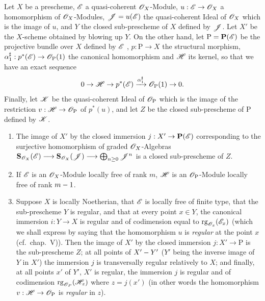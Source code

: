 \begin{proposition}[19.4.11]
\label{IV.19.4.11}
Let $X$ be a prescheme, $\mathscr{E}$ a quasi-coherent $\mathscr{O}_X$-Module, $u:\mathscr{E}\to\mathscr{O}_X$ a homomorphism of $\mathscr{O}_X$-Modules, $\mathscr{J}=u(\mathscr{E})$ the quasi-coherent Ideal of $\mathscr{O}_X$ which is the image of $u$, and $Y$ the closed sub-prescheme of $X$ defined by $\mathscr{J}$. Let $X'$ be the $X$-scheme obtained by blowing up $Y$.
On the other hand, let $\mathrm{P}=\mathbf{P}(\mathscr{E})$ be the projective bundle over $X$ defined by $\mathscr{E}$ , $p:\mathrm{P}\to X$ the structural morphism, $\alpha_1^{\sharp}:p^*(\mathscr{E})\to\mathscr{O}_{\mathrm{P}}(1)$ the canonical homomorphism  and $\mathscr{H}$ its kernel, so that we have an exact sequence
\[
  0\to\mathscr{H}\to p^*(\mathscr{E})\xrightarrow{\alpha_1^{\sharp}}\mathscr{O}_{\mathrm{P}}(1)\to 0.
\]
Finally, let $\mathscr{K}$ be the quasi-coherent Ideal of $\mathscr{O}_{\mathrm{P}}$ which is the image of the restriction $v:\mathscr{H}\to\mathscr{O}_{\mathrm{P}}$ of $p^*(u)$, and let $Z$ be the closed sub-prescheme of $\mathrm{P}$ defined by $\mathscr{K}$.
\begin{enumerate}[label=\textup{(\roman*)}]
  \item The image of $X'$ by the closed immersion $j:X'\to\mathbf{P}(\mathscr{E})$ corresponding to the surjective homomorphism of graded $\mathscr{O}_X$-Algebras $\mathbf{S}_{\mathscr{O}_X}(\mathscr{E})\longrightarrow\mathbf{S}_{\mathscr{O}_X}(\mathscr{J})\longrightarrow\bigoplus_{n\geq 0}\mathscr{J}^n$
   is a closed sub-prescheme of $Z$.
  \item If $\mathscr{E}$ is an $\mathscr{O}_X$-Module locally free of rank $m$, $\mathscr{H}$ is an $\mathscr{O}_{\mathrm{P}}$-Module locally free of rank $m- 1$.
  \item Suppose $X$ is locally Noetherian, that $\mathscr{E}$ is locally free of finite type, that the sub-prescheme $Y$ is regular, and that at every point $x\in Y$, the canonical immersion $i:Y\to X$ is regular and of codimension equal to $\operatorname{rg}_{\mathscr{O}_x}(\mathscr{E}_x)$ \textup{(which we shall express by saying that the homomorphism $u$ is \emph{regular} at the point $x$ (cf.\ chap.~V))}.
Then the image of $X'$ by the closed immersion $j:X'\to\mathrm{P}$ is the sub-prescheme $Z$; at all points of $X'- Y'$ \textup{(}$Y'$ being the inverse image of $Y$ in $X'$\textup{)} the immersion $j$ is transversally regular relatively to $X$; and finally, at all points $x'$ of $Y'$, $X'$ is regular, the immersion $j$ is regular and of codimension $\operatorname{rg}_{\mathscr{O}_P}(\mathscr{H}_z)$ where $z=j(x')$ \textup{(in other words the homomorphism $v:\mathscr{H}\to\mathscr{O}_{\mathrm{P}}$ is \emph{regular} in $z$)}.
\end{enumerate}
\end{proposition}

